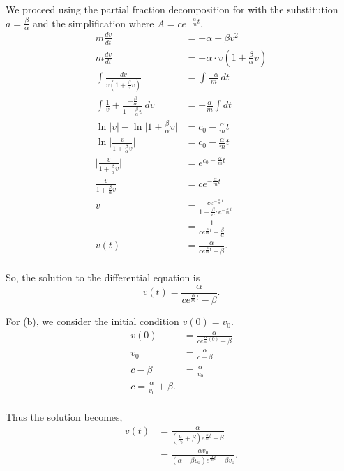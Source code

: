 \documentclass[../hw11]{subfiles}
\begin{document}
We proceed using the partial fraction decomposition for with the substitution $a=\frac{\beta}{\alpha}$ and the simplification where $A=ce^{-\frac{\alpha}{m}t}$.
\begin{align*}
    m\frac{dv}{dt}&=-\alpha-\beta v^2\\
    m\frac{dv}{dt}&=-\alpha\cdot v\left( 1+\frac{\beta}{\alpha}v\right)\\
    \int \frac{dv}{v\left( 1+\frac{\beta}{\alpha}v \right)} &= \int \frac{-\alpha}{m}\,dt \\
    \int \frac{1}{v}+\frac{-\frac{\beta}{\alpha}}{1+\frac{\beta}{\alpha}v}\, dv &= -\frac{\alpha}{m}\int dt \\
    \ln{|v|}-\ln{\bigg|1+\frac{\beta}{\alpha}v\bigg|}&=c_0-\frac{\alpha}{m}t \\
    \ln{\Bigg|\frac{v}{1+\frac{\beta}{\alpha}v}\Bigg|}&=c_0-\frac{\alpha}{m}t \\
    \Bigg|\frac{v}{1+\frac{\beta}{\alpha}v}\Bigg|&=e^{c_0-\frac{\alpha}{m}t} \\
    \frac{v}{1+\frac{\beta}{\alpha}v}&=ce^{-\frac{\alpha}{m}t} \\
    v&=\frac{ce^{-\frac{\alpha}{m}t}}{1-\frac{\beta}{\alpha}ce^{-\frac{\alpha}{m}t}} \\
    &=\frac{1}{ce^{\frac{\alpha}{m}t}-\frac{\beta}{\alpha}} \\
    v(t)&=\frac{\alpha}{ce^{\frac{\alpha}{m}t}-\beta}. \\
\end{align*}

So, the solution to the differential equation is \[v(t)=\frac{\alpha}{ce^{\frac{\alpha}{m}t}-\beta}.\]

For (b), we consider the initial condition $v(0)=v_0$.
\begin{align*}
    v(0)&=\frac{\alpha}{ce^{\frac{\alpha}{m}(0)}-\beta} \\
    v_0&=\frac{\alpha}{c-\beta} \\
    c-\beta&=\frac{\alpha}{v_0} \\
    c = \frac{\alpha}{v_0}+\beta. \\
\end{align*}

Thus the solution becomes,
\begin{align*}
    v(t)&=\frac{\alpha}{\left( \frac{a}{v_0}+\beta \right)e^{\frac{\alpha}{m}t}-\beta} \\
    &=\frac{\alpha v_0}{(\alpha+\beta v_0)e^{\frac{\alpha}{m}t}-\beta v_0}. \\
\end{align*}
\end{document}

